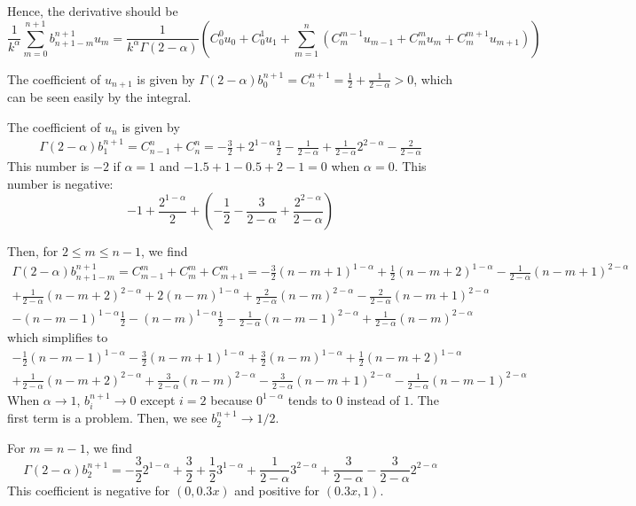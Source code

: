 \documentclass[11pt]{article}
\begin{document}
Hence, the derivative should be $$
\frac{1}{k^{\alpha}}\sum_{m=0}^{n+1}b_{n+1-m}^{n+1}u_m=\frac{1}{k^{\alpha}\Gamma(2-\alpha)}(C_0^0u_0+C_0^1u_1+\sum_{m=1}^n(C_m^{m-1}u_{m-1}
+C_m^{m}u_m+C_m^{m+1}u_{m+1}))
$$

The coefficient of $u_{n+1}$ is given by $\Gamma(2-\alpha)b_{0}^{n+1}=C_n^{n+1}=\frac{1}{2}+\frac{1}{2-\alpha}>0$, which can be seen easily by the integral.

The coefficient of $u_n$ is given by 
\begin{gather*}
\Gamma(2-\alpha)b_1^{n+1}=C_{n-1}^n+C_n^n=-\frac{3}{2}+2^{1-\alpha}\frac{1}{2}
-\frac{1}{2-\alpha}+\frac{1}{2-\alpha}2^{2-\alpha}-\frac{2}{2-\alpha}
\end{gather*}
This number is $-2$ if $\alpha=1$ and $-1.5+1-0.5+2-1=0$ when $\alpha=0$. This number is negative: $$
-1+\frac{2^{1-\alpha}}{2}+(-\frac{1}{2}-\frac{3}{2-\alpha}+\frac{2^{2-\alpha}}{2-\alpha})
$$

Then, for $2\le m\le n-1$, we find
\begin{multline*}
\Gamma(2-\alpha)b_{n+1-m}^{n+1}=C_{m-1}^m+C_m^m+C_{m+1}^m
=-\frac{3}{2}(n-m+1)^{1-\alpha}+\frac{1}{2}(n-m+2)^{1-\alpha}
-\frac{1}{2-\alpha}(n-m+1)^{2-\alpha}\\
+\frac{1}{2-\alpha}(n-m+2)^{2-\alpha}
+2(n-m)^{1-\alpha}+\frac{2}{2-\alpha}(n-m)^{2-\alpha}
-\frac{2}{2-\alpha}(n-m+1)^{2-\alpha}\\
-(n-m-1)^{1-\alpha}\frac{1}{2}-(n-m)^{1-\alpha}\frac{1}{2}
-\frac{1}{2-\alpha}(n-m-1)^{2-\alpha}+\frac{1}{2-\alpha}(n-m)^{2-\alpha}
\end{multline*}
which simplifies to
\begin{multline*}
-\frac{1}{2}(n-m-1)^{1-\alpha}-\frac{3}{2}(n-m+1)^{1-\alpha}+\frac{3}{2}(n-m)^{1-\alpha}+\frac{1}{2}(n-m+2)^{1-\alpha}\\
+\frac{1}{2-\alpha}(n-m+2)^{2-\alpha}
+\frac{3}{2-\alpha}(n-m)^{2-\alpha}
-\frac{3}{2-\alpha}(n-m+1)^{2-\alpha}
-\frac{1}{2-\alpha}(n-m-1)^{2-\alpha}
\end{multline*}
When $\alpha\to 1$, $b_i^{n+1}\to 0$ except $i=2$ because $0^{1-\alpha}$ tends to $0$ instead of $1$. The first term is a problem. Then, we see $b_{2}^{n+1}\to 1/2$. 

For $m=n-1$, we find $$
\Gamma(2-\alpha)b_{2}^{n+1}=-\frac{3}{2}2^{1-\alpha}+\frac{3}{2}+\frac{1}{2}3^{1-\alpha}
+\frac{1}{2-\alpha}3^{2-\alpha}
+\frac{3}{2-\alpha}-\frac{3}{2-\alpha}2^{2-\alpha}
$$
This coefficient is negative for $(0, 0.3x)$ and positive for $(0.3x, 1)$.
\end{document}

